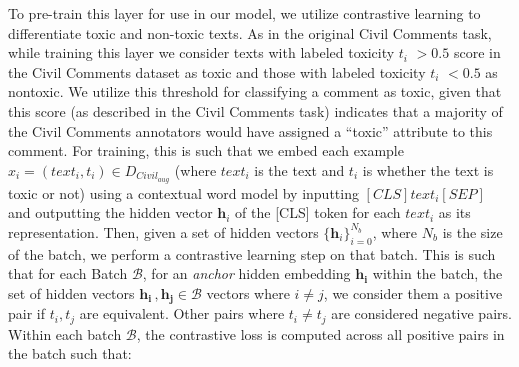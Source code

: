 To pre-train this layer for use in our model, we utilize contrastive learning to differentiate toxic and non-toxic texts. As in the original Civil Comments task, while training this layer we consider texts with labeled toxicity $t_i$ $>0.5$ score in the Civil Comments dataset as toxic and those with labeled toxicity $t_i$ $<0.5$ as nontoxic. We utilize this threshold for classifying a comment as toxic, given that this score (as described in the Civil Comments task) indicates that a majority of the Civil Comments annotators would have assigned a ``toxic'' attribute to this comment. For training, this is such that we embed each example $x_i = (text_i,t_i) \in D_{Civil_{aug}}$ (where $text_i$ is the text and $t_i$ is whether the text is toxic or not) using a contextual word model by inputting $[CLS] text_i [SEP]$ and outputting the hidden vector $\mathbf{h}_i$ of the [CLS] token for each $text_i$ as its representation. Then, given a set of hidden vectors $\{\mathbf{h}_i\}_{i=0}^{N_b}$, where $N_b$ is the size of the batch, we perform a contrastive learning step on that batch. This is such that for each Batch $\mathcal{B}$, for an \textit{anchor} hidden embedding $\mathbf{h_i}$ within the batch, the set of hidden vectors $\mathbf{h_i} \,, \mathbf{h_j} \in \mathcal{B}$ vectors where $i \neq j$, we consider them a positive pair if $t_i, t_j$ are equivalent. Other pairs where $t_i\neq t_j$ are considered negative pairs. Within each batch $\mathcal{B}$, the contrastive loss is computed across all positive pairs in the batch such that:

